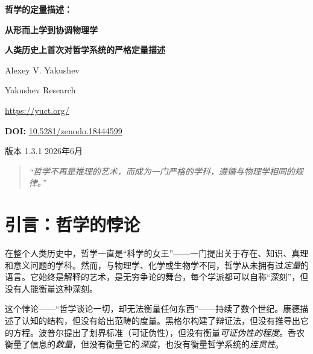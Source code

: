 \documentclass[11pt,a4paper]{article}
\begin{document}
	
	\begin{titlepage}
		\begin{center}
			\vspace*{1cm}
			{\Huge\bfseries\color{darkblue} 哲学的定量描述：\par}
			\vspace{0.3cm}
			{\Huge\bfseries\color{darkblue} 从形而上学到协调物理学\par}
			\vspace{1cm}
			{\Large\bfseries 人类历史上首次对哲学系统的严格定量描述\par}
			\vspace{1.5cm}
			{\large Alexey V. Yakushev\par}
			{\large Yakushev Research\par}
			{\large \url{https://yuct.org/}\par}
			\vspace{1cm}
			{\large \textbf{DOI:} \href{https://doi.org/10.5281/zenodo.18444599}{10.5281/zenodo.18444599}\par}
			\vspace{1cm}
			{\large 版本 1.3.1 \quad 2026年6月\par}
			\vfill
			\begin{quote}
				\itshape
				“哲学不再是推理的艺术，而成为一门严格的学科，遵循与物理学相同的规律。”
			\end{quote}
		\end{center}
	\end{titlepage}
	
	\tableofcontents
	\newpage
	
	\section{引言：哲学的悖论}
	
	在整个人类历史中，哲学一直是“科学的女王”——一门提出关于存在、知识、真理和意义问题的学科。然而，与物理学、化学或生物学不同，哲学从未拥有过\emph{定量}的语言。它始终是解释的艺术，是无穷争论的舞台，每个学派都可以自称“深刻”，但没有人能衡量这种深刻。
	
	这个悖论——“哲学谈论一切，却无法衡量任何东西”——持续了数个世纪。康德描述了认知的结构，但没有给出范畴的度量。黑格尔构建了辩证法，但没有推导出它的方程。波普尔提出了划界标准（可证伪性），但没有衡量\emph{可证伪性的程度}。香农衡量了信息的\emph{数量}，但没有衡量它的\emph{深度}，也没有衡量哲学系统的\emph{连贯性}。
	
\end{document}
